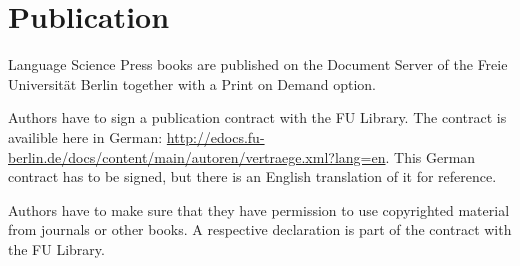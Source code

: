 \chapter{Publication}

Language Science Press books are published on the Document Server of the Freie Universität Berlin
together with a Print on Demand option.



Authors have to sign a publication contract with the FU Library. The contract is availible here in
German:
\url{http://edocs.fu-berlin.de/docs/content/main/autoren/vertraege.xml?lang=en}. This
German contract has to be signed, but there is an English translation of it for reference.


Authors have to make sure that they have permission to use copyrighted material from journals or
other books. A respective declaration is part of the contract with the FU Library.


